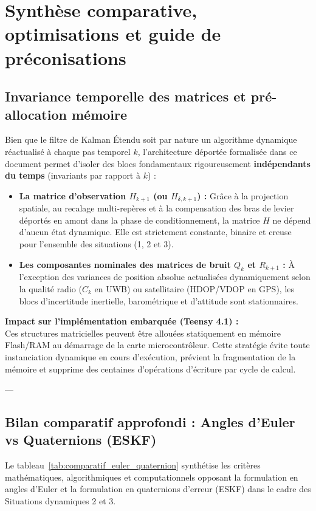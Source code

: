 \documentclass[../Formulations_Kalman.tex]{subfiles}
\begin{document}
\section{Synthèse comparative, optimisations et guide de préconisations}

\subsection{Invariance temporelle des matrices et pré-allocation mémoire}
Bien que le filtre de Kalman Étendu soit par nature un algorithme dynamique réactualisé à chaque pas temporel $k$, l'architecture déportée formalisée dans ce document permet d'isoler des blocs fondamentaux rigoureusement \textbf{indépendants du temps} (invariants par rapport à $k$) :
\begin{itemize}
    \item \textbf{La matrice d'observation $H_{k+1}$ (ou $H_{\delta, k+1}$) :} Grâce à la projection spatiale, au recalage multi-repères et à la compensation des bras de levier déportés en amont dans la phase de conditionnement, la matrice $H$ ne dépend d'aucun état dynamique. Elle est strictement constante, binaire et creuse pour l'ensemble des situations (1, 2 et 3).
    \item \textbf{Les composantes nominales des matrices de bruit $Q_k$ et $R_{k+1}$ :} À l'exception des variances de position absolue actualisées dynamiquement selon la qualité radio ($C_k$ en UWB) ou satellitaire (HDOP/VDOP en GPS), les blocs d'incertitude inertielle, barométrique et d'attitude sont stationnaires.
\end{itemize}

\textbf{Impact sur l'implémentation embarquée (Teensy 4.1) :} \\
Ces structures matricielles peuvent être allouées statiquement en mémoire Flash/RAM au démarrage de la carte microcontrôleur. Cette stratégie évite toute instanciation dynamique en cours d'exécution, prévient la fragmentation de la mémoire et supprime des centaines d'opérations d'écriture par cycle de calcul.

---

\subsection{Bilan comparatif approfondi : Angles d'Euler vs Quaternions (ESKF)}
Le tableau~\ref{tab:comparatif_euler_quaternion} synthétise les critères mathématiques, algorithmiques et computationnels opposant la formulation en angles d'Euler et la formulation en quaternions d'erreur (ESKF) dans le cadre des Situations dynamiques 2 et 3.
\end{document}
